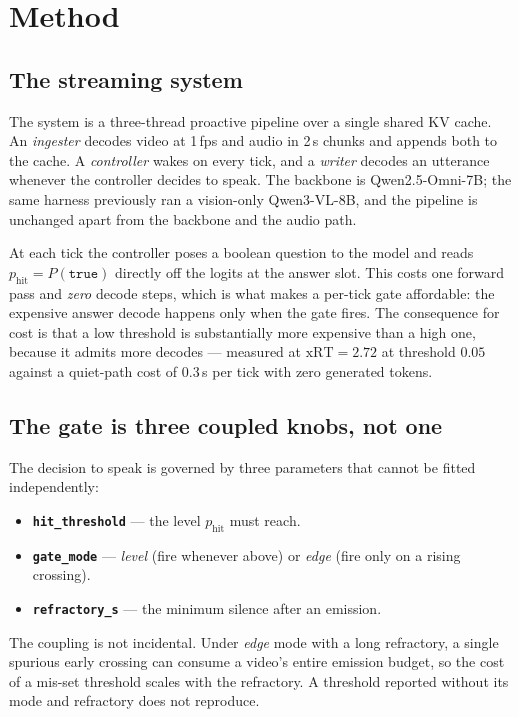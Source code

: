 \section{Method}
\label{sec:method}

\subsection{The streaming system}

The system is a three-thread proactive pipeline over a single shared KV cache. An
\emph{ingester} decodes video at 1\,fps and audio in 2\,s chunks and appends both
to the cache. A \emph{controller} wakes on every tick, and a \emph{writer} decodes
an utterance whenever the controller decides to speak. The backbone is
Qwen2.5-Omni-7B; the same harness previously ran a vision-only Qwen3-VL-8B, and
the pipeline is unchanged apart from the backbone and the audio path.

At each tick the controller poses a boolean question to the model and reads
$p_{\mathrm{hit}} = P(\texttt{true})$ directly off the logits at the answer slot.
This costs one forward pass and \emph{zero} decode steps, which is what makes a
per-tick gate affordable: the expensive answer decode happens only when the gate
fires. The consequence for cost is that a low threshold is substantially more
expensive than a high one, because it admits more decodes --- measured at
$\mathrm{xRT}=2.72$ at threshold $0.05$ against a quiet-path cost of
$0.3$\,s per tick with zero generated tokens.

\subsection{The gate is three coupled knobs, not one}

The decision to speak is governed by three parameters that cannot be fitted
independently:

\begin{itemize}
\item \textbf{\texttt{hit\_threshold}} --- the level $p_{\mathrm{hit}}$ must reach.
\item \textbf{\texttt{gate\_mode}} --- \emph{level} (fire whenever above) or
      \emph{edge} (fire only on a rising crossing).
\item \textbf{\texttt{refractory\_s}} --- the minimum silence after an emission.
\end{itemize}

The coupling is not incidental. Under \emph{edge} mode with a long refractory, a
single spurious early crossing can consume a video's entire emission budget, so
the cost of a mis-set threshold scales with the refractory. A threshold reported
without its mode and refractory does not reproduce.

